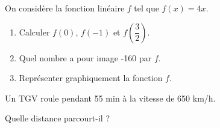 \documentclass[a4paper,12pt]{article}
\begin{document}
\begin{exo}[8]
On considère la fonction linéaire $f$ tel que $f(x)=4x$.
\begin{enumerate}
\item Calculer $f(0)$, $f(-1)$ et $f(\dfrac{3}{2})$.\\
\anserline[4]
\item Quel nombre a pour image -160 par $f$.\\
\anserline[2]
\item Représenter graphiquement la fonction $f$.\\
\anserline[14]
\end{enumerate}
\end{exo}

\begin{exo}[2]
\begin{minipage}{.5\linewidth}
Un TGV roule pendant 55 min  à la vitesse de 650 km/h.

Quelle distance parcourt-il ?
\end{minipage}%
\begin{minipage}{.5\linewidth}
\anserline[4]
\end{minipage}%
\end{exo}
\end{document}

